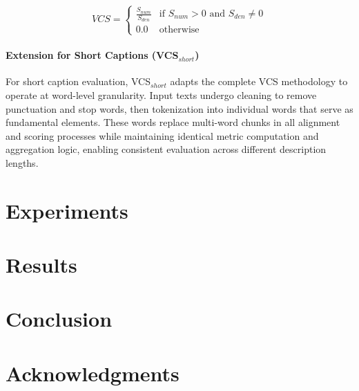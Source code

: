 \documentclass[letterpaper]{article} %
\begin{document}
\begin{equation} \label{eq:vcs_revised}
VCS =
\begin{cases}
\frac{S_{num}}{S_{den}} & \text{if } S_{num} > 0 \text{ and } S_{den} \neq 0 \\
0.0 & \text{otherwise}
\end{cases}
\end{equation}

\paragraph{Extension for Short Captions (VCS$_{short}$)}
For short caption evaluation, VCS$_{short}$ adapts the complete VCS methodology to operate at word-level granularity. Input texts undergo cleaning to remove punctuation and stop words, then tokenization into individual words that serve as fundamental elements. These words replace multi-word chunks in all alignment and scoring processes while maintaining identical metric computation and aggregation logic, enabling consistent evaluation across different description lengths.


\section{Experiments}

\section{Results}

\section{Conclusion}

\section*{Acknowledgments}


\end{document}
